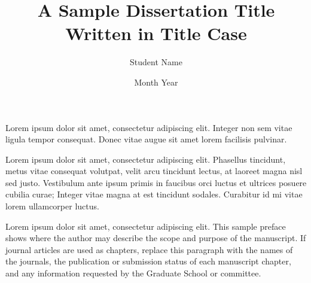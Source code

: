 \documentclass[doctoral,fulldocument,secnum,pdfonly,boundcover]{uofm}
\title{A Sample Dissertation Title Written in Title Case}
\author{Student Name}
\date{Month Year}
\begin{document}

\maketitle

\frontmatter

\copyrightpage

\begin{dedication}
Lorem ipsum dolor sit amet, consectetur adipiscing elit. Integer non sem vitae
ligula tempor consequat. Donec vitae augue sit amet lorem facilisis pulvinar.
\end{dedication}

\begin{acknowledgments}
Lorem ipsum dolor sit amet, consectetur adipiscing elit. Phasellus tincidunt,
metus vitae consequat volutpat, velit arcu tincidunt lectus, at laoreet magna
nisl sed justo. Vestibulum ante ipsum primis in faucibus orci luctus et ultrices
posuere cubilia curae; Integer vitae magna at est tincidunt sodales. Curabitur
id mi vitae lorem ullamcorper luctus.
\end{acknowledgments}

\begin{preface}
Lorem ipsum dolor sit amet, consectetur adipiscing elit. This sample preface
shows where the author may describe the scope and purpose of the manuscript.
If journal articles are used as chapters, replace this paragraph with the names
of the journals, the publication or submission status of each manuscript chapter,
and any information requested by the Graduate School or committee.
\end{preface}
\end{document}
